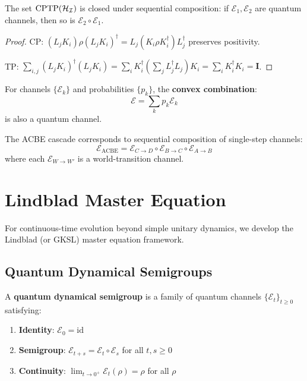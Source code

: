 \begin{proposition}
\label{prop:cptp-composition}
The set $\mathrm{CPTP}(\mathcal{H}_{\mathcal{I}})$ is closed under sequential composition: if $\mathcal{E}_1, \mathcal{E}_2$ are quantum channels, then so is $\mathcal{E}_2 \circ \mathcal{E}_1$.
\end{proposition}

\begin{proof}
CP: $(L_j K_i) \rho (L_j K_i)^\dagger = L_j (K_i \rho K_i^\dagger) L_j^\dagger$ preserves positivity.

TP: $\sum_{i,j} (L_j K_i)^\dagger (L_j K_i) = \sum_i K_i^\dagger (\sum_j L_j^\dagger L_j) K_i = \sum_i K_i^\dagger K_i = \mathbf{I}$.
\end{proof}

\begin{definition}
\label{def:convex-channels}
For channels $\{\mathcal{E}_k\}$ and probabilities $\{p_k\}$, the \textbf{convex combination}:
\[
\mathcal{E} = \sum_k p_k \mathcal{E}_k
\]
is also a quantum channel.
\end{definition}

\begin{proposition}
\label{prop:noetic-cascade}
The ACBE cascade corresponds to sequential composition of single-step channels:
\[
\mathcal{E}_{\mathrm{ACBE}} = \mathcal{E}_{C \to D} \circ \mathcal{E}_{B \to C} \circ \mathcal{E}_{A \to B}
\]
where each $\mathcal{E}_{W \to W'}$ is a world-transition channel.
\end{proposition}

\section{Lindblad Master Equation}
\label{sec:master-equations}

For continuous-time evolution beyond simple unitary dynamics, we develop the Lindblad (or GKSL) master equation framework.

\subsection{Quantum Dynamical Semigroups}

\begin{definition}
\label{def:qds}
A \textbf{quantum dynamical semigroup} is a family of quantum channels $\{\mathcal{E}_t\}_{t \geq 0}$ satisfying:
\begin{enumerate}
  \item \textbf{Identity}: $\mathcal{E}_0 = \mathrm{id}$
  \item \textbf{Semigroup}: $\mathcal{E}_{t+s} = \mathcal{E}_t \circ \mathcal{E}_s$ for all $t, s \geq 0$
  \item \textbf{Continuity}: $\lim_{t \to 0^+} \mathcal{E}_t(\rho) = \rho$ for all $\rho$
\end{enumerate}
\end{definition}

